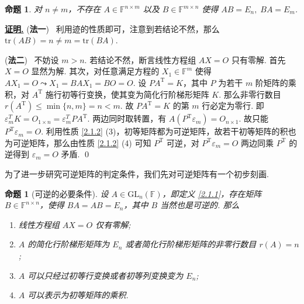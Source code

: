 \documentclass[10pt,openany]{article}
\theoremstyle{thmstyle} %
\theoremstyle{defstyle} %
\theoremstyle{prostyle} %
\newtheorem{proposition}[theorem]{命题}
\theoremstyle{exastyle}
\theoremstyle{remstyle}
\renewenvironment{proof}[1][证明]{\par\underline{\textbf{#1.}} \;\fangsong}{\qed\par}
\newcommand{\T}{^{\text{T}}}
\newcommand{\F}{\mathbb{F}}
\newcommand{\gfn}{\text{GL}_n(\mathbb{F})}
\newcommand{\n}{^{n \times n}}
\newcommand{\mn}{^{m \times n}}
\newcommand{\nm}{^{n \times m}}
\newcommand{\tr}{\mathrm{tr}}
\begin{document}
\begin{proposition}\label{2.1.11}
	对 \( n \neq m \)，不存在 \( A \in \F\nm \) 以及 \( B \in \F\mn \) 使得 \( AB= E_n, \; BA=E_m \).
	
\end{proposition}

\begin{proof}
	(\textbf{法一}) \ 利用迹的性质即可，注意到若结论不然，那么 \(\tr(AB)=n \neq m=\tr(BA) \).
	
	\vspace{1ex}
	
	(\textbf{法二}) \ 不妨设 \( m>n \). 若结论不然，断言线性方程组 \( AX=O \) 只有零解. 首先 \( X=O \) 显然为解. 其次，对任意满足方程的 \( X_1 \in \F^m \) 使得 \( AX_1=O \leadsto X_1=BAX_1=BO=O \). 设 \( PA\T=K \)，其中 \( P \) 为若干 \( m \) 阶矩阵的乘积，对 \( A\T \) 施行初等行变换，使其变为简化行阶梯形矩阵 \( K \). 那么非零行数目 \( r(A\T) \leq \min\{n,m\}=n<m \). 故 \( PA\T=K \) 的第 \( m \) 行必定为零行. 即 \( \varepsilon_m^T K= O_{1 \times n}= \varepsilon_m^T PA\T \). 两边同时取转置，有 \( A(P\T\varepsilon_m)=O_{n \times 1} \). 故只能 \( P\T\varepsilon_m=O \). 利用性质 \ref{2.1.2} (3)，初等矩阵都为可逆矩阵，故若干初等矩阵的积也为可逆矩阵，那么由性质 \ref{2.1.2} (4) 可知 \( P\T \) 可逆，对  \( P\T\varepsilon_m=O \) 两边同乘 \( P\T \) 的逆得到 \( \varepsilon_m=O \) 矛盾.
\end{proof}

为了进一步研究可逆矩阵的判定条件，我们先对可逆矩阵有一个初步刻画.

\begin{proposition}[可逆的必要条件]\label{2.1.12}
	设 \( A \in \gfn \)，即定义 \ref{2.1.1}，存在矩阵 \( B \in \F\n \)，使得 \( BA=AB=E_n \)，其中 \( B \) 当然也是可逆的. 那么
	\begin{enumerate}[(1)]
		\item 线性方程组 \( AX=O \) 仅有零解;
		\item \( A \) 的简化行阶梯形矩阵为 \( E_n \) 或者简化行阶梯形矩阵的非零行数目 \( r(A)=n \);
		\item \( A \) 可以只经过初等行变换或者初等列变换变为 \( E_n \);
		\item \( A \) 可以表示为初等矩阵的乘积.
	\end{enumerate}
	
\end{proposition}
\end{document}

